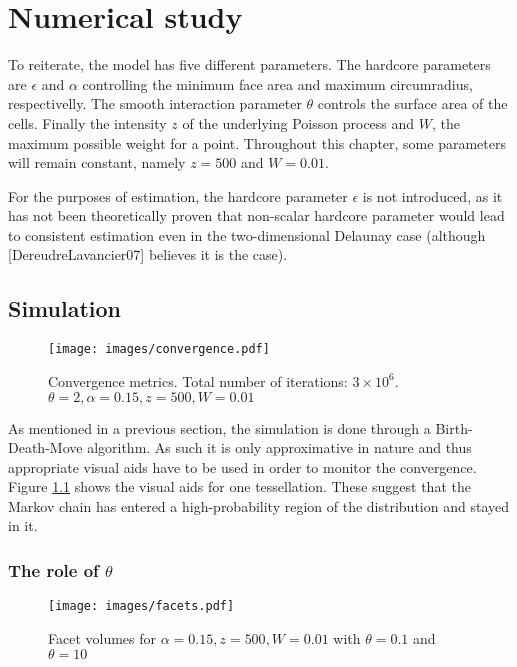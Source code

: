 \documentclass[12pt,a4paper]{report}
\begin{document}
\chapter{Numerical study}
To reiterate, the model has five different parameters. The hardcore parameters are $\epsilon$ and $ \alpha$ controlling the minimum face area and maximum circumradius, respectivelly. The smooth interaction parameter $\theta$ controls the surface area of the cells. Finally the intensity $z$ of the underlying Poisson process and $W$, the maximum possible weight for a point. Throughout this chapter, some parameters will remain constant, namely $z = 500$ and $W = 0.01$.

For the purposes of estimation, the hardcore parameter $\epsilon$ is not introduced, as it has not been theoretically proven that non-scalar hardcore parameter would lead to consistent estimation even in the two-dimensional Delaunay case (although [DereudreLavancier07] believes it is the case). \newline


 
\section{Simulation}

\begin{figure}[h]
    \centering
    \texttt{[image: images/convergence.pdf]}
    \caption{Convergence metrics. Total number of iterations: $3\times 10^6$. $\theta=2, \alpha = 0.15, z = 500, W = 0.01$}
    \label{fig:conv}
\end{figure}

As mentioned in a previous section, the simulation is done through a Birth-Death-Move algorithm. As such it is only approximative in nature and thus appropriate visual aids have to be used in order to monitor the convergence. Figure \ref{fig:conv}  shows the visual aids for one tessellation. These suggest that the Markov chain has entered a high-probability region of the distribution and stayed in it. 


\subsection{The role of $\theta$}
\begin{figure}[h]
    \centering
    \texttt{[image: images/facets.pdf]}
    \caption{Facet volumes for $\alpha = 0.15, z = 500, W = 0.01$ with $\theta=0.1$ and $\theta=10$}
    \label{fig:facets}
\end{figure}
\end{document}

